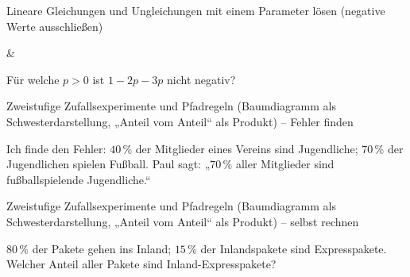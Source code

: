 \begin{aufgabe}{Lineare Gleichungen und Ungleichungen mit einem Parameter lösen (negative Werte ausschließen)}
\begin{gleichungsraster}[2]
 &
\end{gleichungsraster}
\begin{teile}
\teil Für welche $p > 0$ ist $1 - 2p - 3p$ nicht negativ? \leerfeld
\end{teile}
\end{aufgabe}

\begin{aufgabe}{Zweistufige Zufallsexperimente und Pfadregeln (Baumdiagramm als Schwesterdarstellung, „Anteil vom Anteil“ als Produkt) – Fehler finden}
\begin{teile}
\teil Ich finde den Fehler: $40\,\%$ der Mitglieder eines Vereins sind Jugendliche; $70\,\%$ der Jugendlichen spielen Fußball. Paul sagt: „$70\,\%$ aller Mitglieder sind fußballspielende Jugendliche.“
\end{teile}
\end{aufgabe}

\begin{aufgabe}{Zweistufige Zufallsexperimente und Pfadregeln (Baumdiagramm als Schwesterdarstellung, „Anteil vom Anteil“ als Produkt) – selbst rechnen}
\begin{teile}
\teil $80\,\%$ der Pakete gehen ins Inland; $15\,\%$ der Inlandspakete sind Expresspakete. Welcher Anteil aller Pakete sind Inland-Expresspakete? \leerfeld[\%]
\end{teile}
\end{aufgabe}
